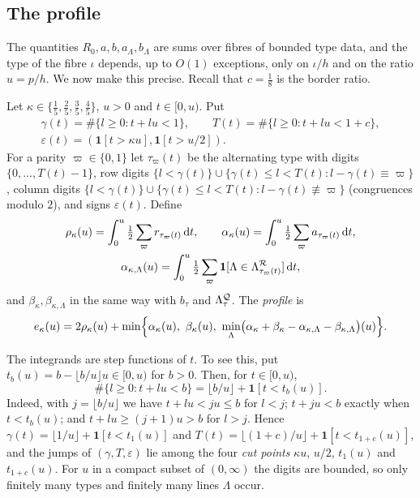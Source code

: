 \subsection{The profile}\label{subsec:profile}

The quantities $R_0,a,b,a_\Lambda,b_\Lambda$ are sums over fibres of bounded type data, and the
type of the fibre $\iota$ depends, up to $O(1)$ exceptions, only on $\iota/h$ and on the ratio
$u=p/h$. We now make this precise. Recall that $c=\frac18$ is the border ratio.

\begin{definition}[Profile]\label{def:profile}
Let $\kappa\in\{\frac15,\frac25,\frac35,\frac45\}$, $u>0$ and $t\in[0,u)$. Put
\begin{gather*}
  \gamma(t)=\#\{l\ge0:t+lu<1\},\qquad T(t)=\#\{l\ge0:t+lu<1+c\},\\
  \varepsilon(t)=(\mathbf1[t>\kappa u],\mathbf1[t>u/2]).
\end{gather*}
For a parity $\varpi\in\{0,1\}$ let $\tau_\varpi(t)$ be the alternating type with digits
$\{0,\dots,T(t)-1\}$, row digits
$\{l<\gamma(t)\}\cup\{\gamma(t)\le l<T(t):l-\gamma(t)\equiv\varpi\}$, column digits
$\{l<\gamma(t)\}\cup\{\gamma(t)\le l<T(t):l-\gamma(t)\not\equiv\varpi\}$ (congruences modulo $2$),
and signs $\varepsilon(t)$. Define
\begin{gather*}
  \rho_\kappa(u)=\int_0^u\tfrac12\sum_{\varpi}r_{\tau_\varpi(t)}\,\mathrm{d} t,\qquad
  \alpha_\kappa(u)=\int_0^u\tfrac12\sum_{\varpi}a_{\tau_\varpi(t)}\,\mathrm{d} t,\\
  \alpha_{\kappa,\Lambda}(u)=\int_0^u\tfrac12\sum_{\varpi}\mathbf1[\Lambda\in\Lambda^{\mathcal{R}}_{\tau_\varpi(t)}]\,\mathrm{d} t,
\end{gather*}
and $\beta_\kappa,\beta_{\kappa,\Lambda}$ in the same way with $b_\tau$ and $\Lambda^{\mathcal{Q}}_\tau$.
The \emph{profile} is
\[
  e_\kappa(u)=2\rho_\kappa(u)+\min\Bigl\{\alpha_\kappa(u),\ \beta_\kappa(u),\
  \min_\Lambda\bigl(\alpha_\kappa+\beta_\kappa-\alpha_{\kappa,\Lambda}-\beta_{\kappa,\Lambda}\bigr)(u)\Bigr\}.
\]
\end{definition}

The integrands are step functions of $t$. To see this, put $t_b(u)=b-\lfloor b/u\rfloor u\in[0,u)$
for $b>0$. Then, for $t\in[0,u)$,
\begin{equation}\label{eq:digit-count}
  \#\{l\ge0:t+lu<b\}=\lfloor b/u\rfloor+\mathbf1[t<t_b(u)] .
\end{equation}
Indeed, with $j=\lfloor b/u\rfloor$ we have $t+lu<ju\le b$ for $l<j$; $t+ju<b$ exactly when
$t<t_b(u)$; and $t+lu\ge(j+1)u>b$ for $l>j$. Hence
$\gamma(t)=\lfloor1/u\rfloor+\mathbf1[t<t_1(u)]$ and
$T(t)=\lfloor(1+c)/u\rfloor+\mathbf1[t<t_{1+c}(u)]$, and the jumps of $(\gamma,T,\varepsilon)$ lie
among the four \emph{cut points} $\kappa u$, $u/2$, $t_1(u)$ and $t_{1+c}(u)$. For $u$ in a compact
subset of $(0,\infty)$ the digits are bounded, so only finitely many types and finitely many lines
$\Lambda$ occur.

